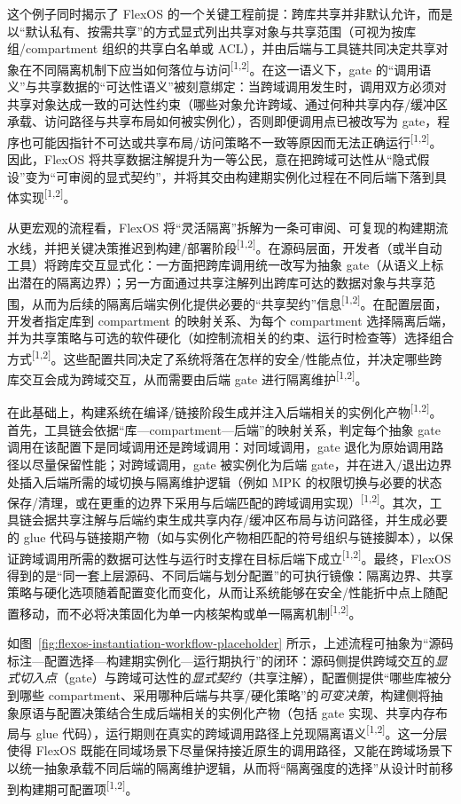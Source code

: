 \documentclass[UTF8,a4paper,12pt,twoside]{ctexart}  %
\begin{document}
这个例子同时揭示了 FlexOS 的一个关键工程前提：跨库共享并非默认允许，而是以“默认私有、按需共享”的方式显式列出共享对象与共享范围（可视为按库组/compartment 组织的共享白名单或 ACL），并由后端与工具链共同决定共享对象在不同隔离机制下应当如何落位与访问\textsuperscript{[1,2]}。在这一语义下，gate 的“调用语义”与共享数据的“可达性语义”被刻意绑定：当跨域调用发生时，调用双方必须对共享对象达成一致的可达性约束（哪些对象允许跨域、通过何种共享内存/缓冲区承载、访问路径与共享布局如何被实例化），否则即便调用点已被改写为 gate，程序也可能因指针不可达或共享布局/访问策略不一致等原因而无法正确运行\textsuperscript{[1,2]}。因此，FlexOS 将共享数据注解提升为一等公民，意在把跨域可达性从“隐式假设”变为“可审阅的显式契约”，并将其交由构建期实例化过程在不同后端下落到具体实现\textsuperscript{[1,2]}。

从更宏观的流程看，FlexOS 将“灵活隔离”拆解为一条可审阅、可复现的构建期流水线，并把关键决策推迟到构建/部署阶段\textsuperscript{[1,2]}。在源码层面，开发者（或半自动工具）将跨库交互显式化：一方面把跨库调用统一改写为抽象 gate（从语义上标出潜在的隔离边界）；另一方面通过共享注解列出跨库可达的数据对象与共享范围，从而为后续的隔离后端实例化提供必要的“共享契约”信息\textsuperscript{[1,2]}。在配置层面，开发者指定库到 compartment 的映射关系、为每个 compartment 选择隔离后端，并为共享策略与可选的软件硬化（如控制流相关的约束、运行时检查等）选择组合方式\textsuperscript{[1,2]}。这些配置共同决定了系统将落在怎样的安全/性能点位，并决定哪些跨库交互会成为跨域交互，从而需要由后端 gate 进行隔离维护\textsuperscript{[1,2]}。

在此基础上，构建系统在编译/链接阶段生成并注入后端相关的实例化产物\textsuperscript{[1,2]}。首先，工具链会依据“库—compartment—后端”的映射关系，判定每个抽象 gate 调用在该配置下是同域调用还是跨域调用：对同域调用，gate 退化为原始调用路径以尽量保留性能；对跨域调用，gate 被实例化为后端 gate，并在进入/退出边界处插入后端所需的域切换与隔离维护逻辑（例如 MPK 的权限切换与必要的状态保存/清理，或在更重的边界下采用与后端匹配的跨域调用实现）\textsuperscript{[1,2]}。其次，工具链会据共享注解与后端约束生成共享内存/缓冲区布局与访问路径，并生成必要的 glue 代码与链接期产物（如与实例化产物相匹配的符号组织与链接脚本），以保证跨域调用所需的数据可达性与运行时支撑在目标后端下成立\textsuperscript{[1,2]}。最终，FlexOS 得到的是“同一套上层源码、不同后端与划分配置”的可执行镜像：隔离边界、共享策略与硬化选项随着配置变化而变化，从而让系统能够在安全/性能折中点上随配置移动，而不必将决策固化为单一内核架构或单一隔离机制\textsuperscript{[1,2]}。

如图~\ref{fig:flexos-instantiation-workflow-placeholder} 所示，上述流程可抽象为“源码标注—配置选择—构建期实例化—运行期执行”的闭环：源码侧提供跨域交互的\emph{显式切入点}（gate）与跨域可达性的\emph{显式契约}（共享注解），配置侧提供“哪些库被分到哪些 compartment、采用哪种后端与共享/硬化策略”的\emph{可变决策}，构建侧将抽象原语与配置决策结合生成后端相关的实例化产物（包括 gate 实现、共享内存布局与 glue 代码），运行期则在真实的跨域调用路径上兑现隔离语义\textsuperscript{[1,2]}。这一分层使得 FlexOS 既能在同域场景下尽量保持接近原生的调用路径，又能在跨域场景下以统一抽象承载不同后端的隔离维护逻辑，从而将“隔离强度的选择”从设计时前移到构建期可配置项\textsuperscript{[1,2]}。
\end{document}
